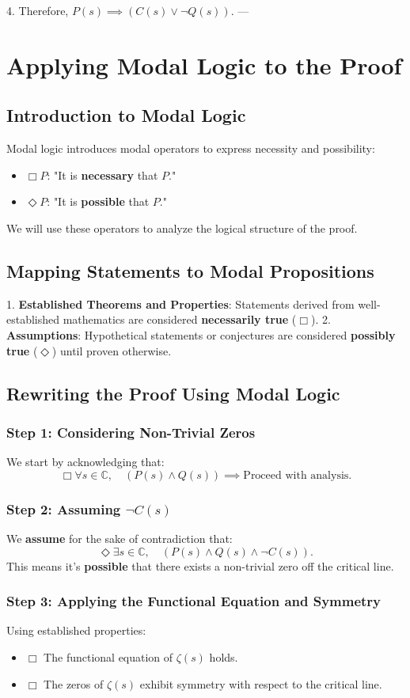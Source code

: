 \documentclass{article}
\begin{document}
4. Therefore, $P(s) \implies \left( C(s) \lor \neg Q(s) \right)$. --- \section{Applying Modal Logic to the Proof} \subsection{Introduction to Modal Logic} Modal logic introduces modal operators to express necessity and possibility: \begin{itemize} \item $\Box P$: "It is \textbf{necessary} that $P$." \item $\Diamond P$: "It is \textbf{possible} that $P$."
\end{itemize} We will use these operators to analyze the logical structure of the proof. \subsection{Mapping Statements to Modal Propositions} 1. \textbf{Established Theorems and Properties}: Statements derived from well-established mathematics are considered \textbf{necessarily true} ($\Box$). 2. \textbf{Assumptions}: Hypothetical statements or conjectures are considered \textbf{possibly true} ($\Diamond$) until proven otherwise. \subsection{Rewriting the Proof Using Modal Logic} \subsubsection{Step 1: Considering Non-Trivial Zeros} We start by acknowledging that: \[
\Box \forall s \in \mathbb{C}, \quad \left( P(s) \land Q(s) \right) \implies \text{Proceed with analysis}.
\] \subsubsection{Step 2: Assuming $\neg C(s)$} We \textbf{assume} for the sake of contradiction that: \[
\Diamond \exists s \in \mathbb{C}, \quad \left( P(s) \land Q(s) \land \neg C(s) \right).
\] This means it's \textbf{possible} that there exists a non-trivial zero off the critical line. \subsubsection{Step 3: Applying the Functional Equation and Symmetry} Using established properties: \begin{itemize} \item $\Box$ The functional equation of $\zeta(s)$ holds. \item $\Box$ The zeros of $\zeta(s)$ exhibit symmetry with respect to the critical line.

\end{itemize}
\end{document}
